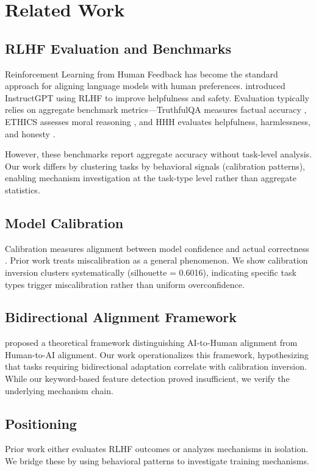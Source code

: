 \section{Related Work}

\subsection{RLHF Evaluation and Benchmarks}

Reinforcement Learning from Human Feedback has become the standard approach for aligning language models with human preferences. \citet{ouyang2022training} introduced InstructGPT using RLHF to improve helpfulness and safety. Evaluation typically relies on aggregate benchmark metrics---TruthfulQA measures factual accuracy \citep{lin2022truthfulqa}, ETHICS assesses moral reasoning \citep{hendrycks2021ethics}, and HHH evaluates helpfulness, harmlessness, and honesty \citep{askell2021general}.

However, these benchmarks report aggregate accuracy without task-level analysis. Our work differs by clustering tasks by behavioral signals (calibration patterns), enabling mechanism investigation at the task-type level rather than aggregate statistics.

\subsection{Model Calibration}

Calibration measures alignment between model confidence and actual correctness \citep{guo2017calibration}. Prior work treats miscalibration as a general phenomenon. We show calibration inversion clusters systematically (silhouette = 0.6016), indicating specific task types trigger miscalibration rather than uniform overconfidence.

\subsection{Bidirectional Alignment Framework}

\citet{shen2024bidirectional} proposed a theoretical framework distinguishing AI-to-Human alignment from Human-to-AI alignment. Our work operationalizes this framework, hypothesizing that tasks requiring bidirectional adaptation correlate with calibration inversion. While our keyword-based feature detection proved insufficient, we verify the underlying mechanism chain.

\subsection{Positioning}

Prior work either evaluates RLHF outcomes or analyzes mechanisms in isolation. We bridge these by using behavioral patterns to investigate training mechanisms.
